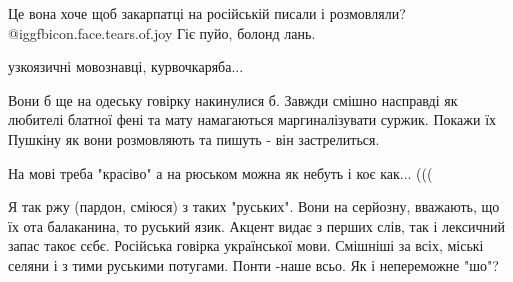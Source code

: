  
Це вона хоче щоб закарпатці на російській писали і розмовляли?  @igg{fbicon.face.tears.of.joy}  Гіє пуйо, болонд лань.

 
узкоязичні мовознавці, курвочкаряба...

 
Вони б ще на одеську говірку накинулися б.
Завжди смішно насправді як любителі блатної фені та мату намагаються маргиналізувати суржик. Покажи їх Пушкіну як вони розмовляють та пишуть - він застрелиться.

 
На мові треба "красіво" а на рюськом можна як небуть і коє как... (((

 

Я так ржу (пардон, сміюся) з таких "руських". Вони на серйозну, вважають, що їх
ота балаканина, то руський язик. Акцент видає з перших слів, так і лексичний
запас такоє сєбє. Російська говірка української мови. Смішніші за всіх, міські
селяни і з тими руськими потугами. Понти -наше всьо. Як і непереможне "шо"?


 

